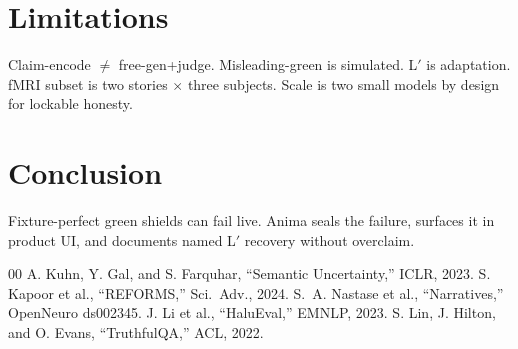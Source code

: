 \documentclass[conference]{IEEEtran}
\begin{document}
\section{Limitations}
Claim-encode $\neq$ free-gen+judge.
Misleading-green is simulated.
L$'$ is adaptation.
fMRI subset is two stories $\times$ three subjects.
Scale is two small models by design for lockable honesty.

\section{Conclusion}
Fixture-perfect green shields can fail live.
Anima seals the failure, surfaces it in product UI, and documents named L$'$ recovery without overclaim.

\begin{thebibliography}{00}
 A. Kuhn, Y. Gal, and S. Farquhar, ``Semantic Uncertainty,'' ICLR, 2023.
 S. Kapoor et al., ``REFORMS,'' Sci.\ Adv., 2024.
 S.~A. Nastase et al., ``Narratives,'' OpenNeuro ds002345.
 J. Li et al., ``HaluEval,'' EMNLP, 2023.
 S. Lin, J. Hilton, and O. Evans, ``TruthfulQA,'' ACL, 2022.
\end{thebibliography}
\end{document}
